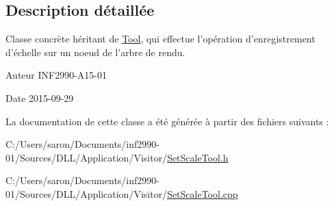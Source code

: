 \subsection{Description détaillée}
Classe concrète héritant de \hyperlink{class_tool}{Tool}, qui effectue l'opération d'enregistrement d'échelle sur un noeud de l'arbre de rendu. 

\begin{DoxyAuthor}{Auteur}
I\-N\-F2990-\/\-A15-\/01 
\end{DoxyAuthor}
\begin{DoxyDate}{Date}
2015-\/09-\/29 
\end{DoxyDate}


La documentation de cette classe a été générée à partir des fichiers suivants \-:\begin{DoxyCompactItemize}
\item 
C\-:/\-Users/saron/\-Documents/inf2990-\/01/\-Sources/\-D\-L\-L/\-Application/\-Visitor/\hyperlink{_set_scale_tool_8h}{Set\-Scale\-Tool.\-h}\item 
C\-:/\-Users/saron/\-Documents/inf2990-\/01/\-Sources/\-D\-L\-L/\-Application/\-Visitor/\hyperlink{_set_scale_tool_8cpp}{Set\-Scale\-Tool.\-cpp}\end{DoxyCompactItemize}
